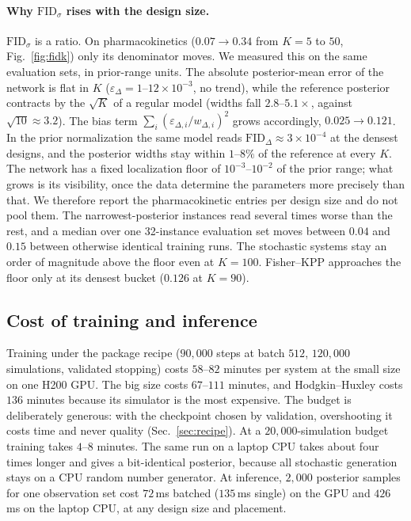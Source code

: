 \documentclass[10pt]{article}
\newcommand{\FIDsd}{\mathrm{FID}_{\sigma}}
\newcommand{\FIDpr}{\mathrm{FID}_{\Delta}}
\begin{document}
\paragraph{Why $\FIDsd$ rises with the design size.} $\FIDsd$ is a ratio. On pharmacokinetics
($0.07 \to 0.34$ from $K = 5$ to $50$, Fig.~\ref{fig:fidk}) only its denominator moves. We measured
this on the same evaluation sets, in prior-range units. The absolute posterior-mean error of the
network is flat in $K$ ($\varepsilon_\Delta = 1$--$12 \times 10^{-3}$, no trend), while the reference
posterior contracts by the $\sqrt{K}$ of a regular model (widths fall $2.8$--$5.1\times$, against
$\sqrt{10} \approx 3.2$). The bias term $\sum_i (\varepsilon_{\Delta,i}/w_{\Delta,i})^2$ grows
accordingly, $0.025 \to 0.121$. In the prior normalization the same model reads
$\FIDpr \approx 3 \times 10^{-4}$ at the densest designs, and the posterior widths stay within
$1$--$8\%$ of the reference at every $K$. The network has a fixed localization floor of
$10^{-3}$--$10^{-2}$ of the prior range; what grows is its visibility, once the data determine the
parameters more precisely than that. We therefore report the pharmacokinetic entries per design size
and do not pool them. The narrowest-posterior instances read several times worse than the rest, and a
median over one 32-instance evaluation set moves between $0.04$ and $0.15$ between otherwise
identical training runs. The stochastic systems stay an order of magnitude above the floor even at
$K = 100$. Fisher--KPP approaches the floor only at its densest bucket ($0.126$ at $K = 90$).

\subsection{Cost of training and inference}
\label{sec:cost}

Training under the package recipe ($90{,}000$ steps at batch $512$, $120{,}000$ simulations,
validated stopping) costs $58$--$82$ minutes per system at the small size on one H200 GPU. The big
size costs $67$--$111$ minutes, and Hodgkin--Huxley costs $136$ minutes because its simulator is the
most expensive. The budget is deliberately generous: with the checkpoint chosen by validation,
overshooting it costs time and never quality (Sec.~\ref{sec:recipe}). At a $20{,}000$-simulation
budget training takes $4$--$8$ minutes. The same run on a laptop CPU takes about four times longer
and gives a bit-identical posterior, because all stochastic generation stays on a CPU random number
generator. At inference, $2{,}000$ posterior samples for one observation set cost $72$\,ms batched
($135$\,ms single) on the GPU and $426$\,ms on the laptop CPU, at any design size and placement.
\end{document}

